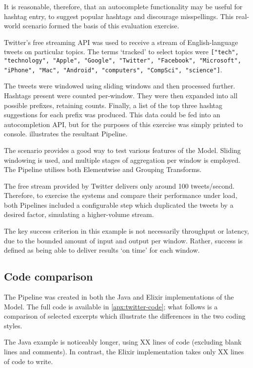 It is reasonable, therefore, that an autocomplete functionality may be useful for hashtag entry, to suggest popular hashtags and discourage misspellings.
This real-world scenario formed the basis of this evaluation exercise.

Twitter's free streaming API \cite{TwitterStreamingAPI} was used to receive a stream of English-language tweets on particular topics.
The terms `tracked' to select topics were \texttt{["tech", "technology", "Apple", "Google", "Twitter", "Facebook", "Microsoft", "iPhone", "Mac", "Android", "computers", "CompSci", "science"]}.

The tweets were windowed using sliding windows and then processed further.
Hashtags present were counted per-window.
They were then expanded into all possible prefixes, retaining counts.
Finally, a list of the top three hashtag suggestions for each prefix was produced.
This data could be fed into an autocompletion API, but for the purposes of this exercise was simply printed to console.
 illustrates the resultant Pipeline.

The scenario provides a good way to test various features of the Model.
Sliding windowing is used, and multiple stages of aggregation per window is employed.
The Pipeline utilises both Elementwise and Grouping Transforms.

The free stream provided by Twitter delivers only around 100 tweets/second.
Therefore, to exercise the systems and compare their performance under load, both Pipelines included a configurable step which duplicated the tweets by a desired factor, simulating a higher-volume stream.

The key success criterion in this example is not necessarily throughput or latency, due to the bounded amount of input and output per window.
Rather, success is defined as being able to deliver results `on time' for each window.

\subsection{Code comparison}\label{sec:eval:code}

The Pipeline was created in both the Java and Elixir implementations of the Model.
The full code is available in \cref{apx:twitter-code}; what follows is a comparison of selected excerpts which illustrate the differences in the two coding styles.

The Java example is noticeably longer, using XX lines of code (excluding blank lines and comments).
In contrast, the Elixir implementation takes only XX lines of code to write.

